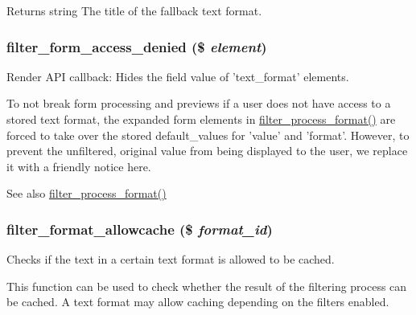 \begin{DoxyReturn}{Returns}
string The title of the fallback text format. 
\end{DoxyReturn}
\hypertarget{filter_8module_ab57887ced69322fceb2f9e70b6e92650}{
\subsubsection[{filter\_\-form\_\-access\_\-denied}]{\setlength{\rightskip}{0pt plus 5cm}filter\_\-form\_\-access\_\-denied (\$ {\em element})}}
\label{filter_8module_ab57887ced69322fceb2f9e70b6e92650}
Render API callback: Hides the field value of 'text\_\-format' elements.

To not break form processing and previews if a user does not have access to a stored text format, the expanded form elements in \hyperlink{filter_8module_a7d09545c482bcb763bd50529bc00644b}{filter\_\-process\_\-format()} are forced to take over the stored default\_\-values for 'value' and 'format'. However, to prevent the unfiltered, original value from being displayed to the user, we replace it with a friendly notice here.

\begin{DoxySeeAlso}{See also}
\hyperlink{filter_8module_a7d09545c482bcb763bd50529bc00644b}{filter\_\-process\_\-format()} 
\end{DoxySeeAlso}
\hypertarget{filter_8module_a3bbed48afc05f0a85c9f8a5e3bfd785f}{
\subsubsection[{filter\_\-format\_\-allowcache}]{\setlength{\rightskip}{0pt plus 5cm}filter\_\-format\_\-allowcache (\$ {\em format\_\-id})}}
\label{filter_8module_a3bbed48afc05f0a85c9f8a5e3bfd785f}
Checks if the text in a certain text format is allowed to be cached.

This function can be used to check whether the result of the filtering process can be cached. A text format may allow caching depending on the filters enabled.


